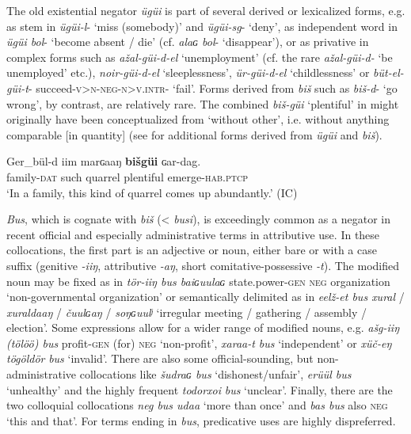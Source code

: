 \documentclass[output=paper,colorlinks,citecolor=brown,chinesefont]{langscibook}
\begin{document}
The old existential negator \textit{ügüi} is part of several derived or lexicalized forms, e.g. as stem in \textit{ügüi-l}{}- ‘miss (somebody)’ and \textit{ügüi-sg}{}- ‘deny’, as independent word in \textit{ügüi bol}{}- ‘become absent / die’ (cf. \textit{alaɢ bol}{}- ‘disappear’), or as privative in complex forms such as \textit{ažal-güi-d-el} ‘unemployment’ (cf. the rare \textit{ažal-güi-d-} ‘be unemployed’ etc.), \textit{noir-güi-d-el} ‘sleeplessness’, \textit{ür-güi-d-el} ‘childlessness’ or \textit{büt-el-güi-t}{}- succeed-\textsc{v>n-neg-n>v.intr}{}- ‘fail’. Forms derived from \textit{biš} such as \textit{biš-d}{}- ‘go wrong’, by contrast, are relatively rare. The combined \textit{biš-güi} ‘plentiful’ in  might originally have been conceptualized from ‘without other’, i.e. without anything comparable [in quantity] (see \citealt[9--10, 14--15]{Bjambasan2001} for additional forms derived from \textit{ügüi} and \textit{biš}).

\ea\label{ex:kha:64}
    \gll Ger\_bül-d iim marɢaaŋ \textbf{bišgüi} ɢar-dag. \\ 
         family-\textsc{dat} such quarrel plentiful emerge-\textsc{hab.ptcp} \\
    \glt ‘In a family, this kind of quarrel comes up abundantly.’ (IC)
\z 


\textit{Bus}, which is cognate with \textit{biš} (< \textit{busi}), is exceedingly common as a negator in recent official and especially administrative terms in attributive use. In these collocations, the first part is an adjective or noun, either bare or with a case suffix (genitive \textit{-iiŋ}, attributive \textit{-aŋ}, short comitative{}-possessive \textit{-t}). The modified noun may be fixed as in \textit{tör{}-iiŋ bus baiɢuulaɢ} state.power-\textsc{gen} \textsc{neg} organization ‘non-governmental organization’ or semantically delimited as in \textit{eelž-et bus xural} / \textit{xuraldaaŋ} / \textit{čuulɢaŋ} / \textit{soŋɢuulʲ} ‘irregular meeting / gathering / assembly / election’. Some expressions allow for a wider range of modified nouns, e.g. \textit{ašg-iiŋ (tölöö) bus} profit-\textsc{gen} (for) \textsc{neg} ‘non-profit’, \textit{xaraa-t bus} ‘independent’ or \textit{xüč-eŋ tögöldör} \textit{bus} ‘invalid’. There are also some official-sounding, but non-administrative collocations like \textit{šudraɢ bus} ‘dishonest/unfair’, \textit{erüül bus} ‘unhealthy’ and the highly frequent \textit{todorxoi} \textit{bus} ‘unclear’. Finally, there are the two colloquial collocations \textit{neg bus udaa} ‘more than once’ and \textit{bas bus} also \textsc{neg} ‘this and that’. For terms ending in \textit{bus}, predicative uses are highly dispreferred. 
\end{document}
